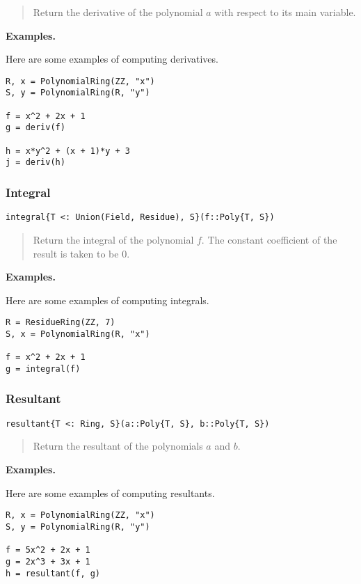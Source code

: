 \documentclass[a4paper,10pt]{article}
\newcommand{\desc}[1]{\vspace{-3mm}\begin{quote}#1\end{quote}}
\begin{document}
{{{\desc{Return the derivative of the polynomial $a$ with respect to its main
variable.}

\textbf{Examples.}

Here are some examples of computing derivatives.

\begin{lstlisting}
R, x = PolynomialRing(ZZ, "x")
S, y = PolynomialRing(R, "y")

f = x^2 + 2x + 1
g = deriv(f)

h = x*y^2 + (x + 1)*y + 3
j = deriv(h)
\end{lstlisting}

\subsubsection{Integral}

\begin{lstlisting}
integral{T <: Union(Field, Residue), S}(f::Poly{T, S})
\end{lstlisting}

\desc{Return the integral of the polynomial $f$. The constant coefficient of
the result is taken to be $0$.}

\textbf{Examples.}

Here are some examples of computing integrals.

\begin{lstlisting}
R = ResidueRing(ZZ, 7)
S, x = PolynomialRing(R, "x")

f = x^2 + 2x + 1
g = integral(f)
\end{lstlisting}

\subsubsection{Resultant}

\begin{lstlisting}
resultant{T <: Ring, S}(a::Poly{T, S}, b::Poly{T, S})
\end{lstlisting}

\desc{Return the resultant of the polynomials $a$ and $b$.}

\textbf{Examples.}

Here are some examples of computing resultants.

\begin{lstlisting}
R, x = PolynomialRing(ZZ, "x")
S, y = PolynomialRing(R, "y")

f = 5x^2 + 2x + 1
g = 2x^3 + 3x + 1
h = resultant(f, g)


\end{lstlisting}}}}
\end{document}

